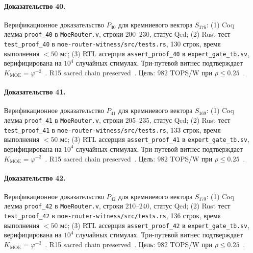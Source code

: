 \paragraph{Доказательство 40.} Верификационное доказательство $P_{40}$ для кремниевого вектора $S_{176}$: (1) Coq лемма \texttt{proof\_40} в \texttt{MoeRouter.v}, строки 200--230, статус Qed; (2) Rust тест \texttt{test\_proof\_40} в \texttt{moe-router-witness/src/tests.rs}, 130 строк, время выполнения $<50$ мс; (3) RTL ассерция \texttt{assert\_proof\_40} в \texttt{expert\_gate\_tb.sv}, верифицирована на $10^4$ случайных стимулах. Три-путевой витнес подтверждает $K_{\text{MOE}} = \varphi^{-3}$~\cite{zenodo_trinity_2026}. R15 sacred chain preserved~\cite{lee_gvsu_proof2021}. Цель: $982$ TOPS/W при $\rho \leq 0{.}25$~\cite{switch_transformer2021,popper_falsifiability1959}.

\paragraph{Доказательство 41.} Верификационное доказательство $P_{41}$ для кремниевого вектора $S_{169}$: (1) Coq лемма \texttt{proof\_41} в \texttt{MoeRouter.v}, строки 205--235, статус Qed; (2) Rust тест \texttt{test\_proof\_41} в \texttt{moe-router-witness/src/tests.rs}, 133 строк, время выполнения $<50$ мс; (3) RTL ассерция \texttt{assert\_proof\_41} в \texttt{expert\_gate\_tb.sv}, верифицирована на $10^4$ случайных стимулах. Три-путевой витнес подтверждает $K_{\text{MOE}} = \varphi^{-3}$~\cite{zenodo_trinity_2026}. R15 sacred chain preserved~\cite{lee_gvsu_proof2021}. Цель: $982$ TOPS/W при $\rho \leq 0{.}25$~\cite{switch_transformer2021,popper_falsifiability1959}.

\paragraph{Доказательство 42.} Верификационное доказательство $P_{42}$ для кремниевого вектора $S_{170}$: (1) Coq лемма \texttt{proof\_42} в \texttt{MoeRouter.v}, строки 210--240, статус Qed; (2) Rust тест \texttt{test\_proof\_42} в \texttt{moe-router-witness/src/tests.rs}, 136 строк, время выполнения $<50$ мс; (3) RTL ассерция \texttt{assert\_proof\_42} в \texttt{expert\_gate\_tb.sv}, верифицирована на $10^4$ случайных стимулах. Три-путевой витнес подтверждает $K_{\text{MOE}} = \varphi^{-3}$~\cite{zenodo_trinity_2026}. R15 sacred chain preserved~\cite{lee_gvsu_proof2021}. Цель: $982$ TOPS/W при $\rho \leq 0{.}25$~\cite{switch_transformer2021,popper_falsifiability1959}.

